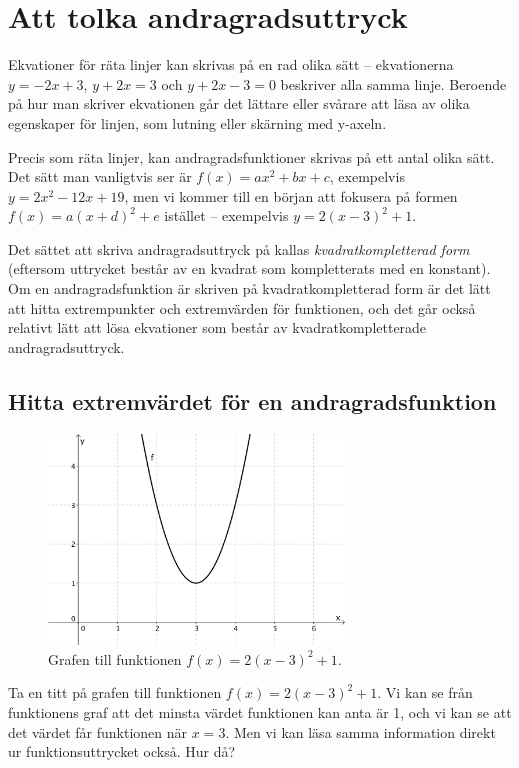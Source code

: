 \section{Att tolka andragradsuttryck}

Ekvationer för räta linjer kan skrivas på en rad olika sätt -- ekvationerna $y = -2x + 3$, $y + 2x = 3$ och $y + 2x - 3 = 0$ beskriver alla samma linje.
Beroende på hur man skriver ekvationen går det lättare eller svårare att läsa av olika egenskaper för linjen, som lutning eller skärning med y-axeln.

Precis som räta linjer, kan andragradsfunktioner skrivas på ett antal olika sätt.
Det sätt man vanligtvis ser är \mbox{$f(x) = ax^2 + bx + c$}, exempelvis $y=2x^2 - 12x + 19$, men vi kommer till en början att fokusera på formen \mbox{$f(x) = a(x+d)^2+e$} istället -- exempelvis $y=2(x-3)^2+1$.

Det sättet att skriva andragradsuttryck på kallas \emph{kvadratkompletterad form} (eftersom uttrycket består av en kvadrat som kompletterats med en konstant).
Om en andragradsfunktion är skriven på kvadratkompletterad form är det lätt att hitta extrempunkter och extremvärden för funktionen, och det går också relativt lätt att lösa ekvationer som består av kvadratkompletterade andragradsuttryck.

\subsection{Hitta extremvärdet för en andragradsfunktion}

\begin{figure}
  \centering
  \includegraphics[width=0.7\textwidth]{bilder/poskurva1.png}
  \caption{\label{fig:poskurva1}Grafen till funktionen $f(x)=2(x-3)^2+1$.}
\end{figure}

Ta en titt på grafen till funktionen $f(x) = 2(x-3)^2+1$.
Vi kan se från funktionens graf att det minsta värdet funktionen kan anta är 1, och vi kan se att det värdet får funktionen när $x=3$.
Men vi kan läsa samma information direkt ur funktionsuttrycket också. Hur då?

